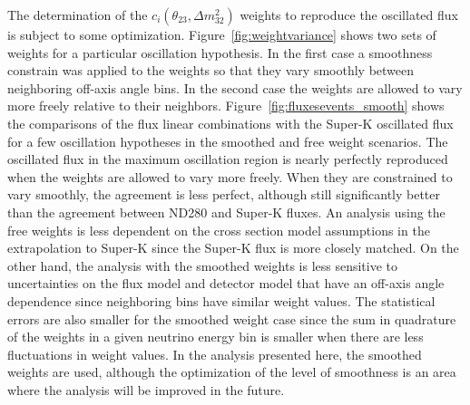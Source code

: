 The determination of the $c_i\left(\theta_{23},\Delta m^2_{32}\right)$ weights to reproduce the oscillated flux is subject to some optimization. Figure~\ref{fig:weightvariance} shows two sets of weights for a particular oscillation hypothesis.  In the first case a smoothness constrain was applied to the weights so that they vary smoothly between neighboring off-axis angle bins. In the second case the weights are allowed to vary more freely relative to their neighbors.  Figure~\ref{fig:fluxesevents_smooth} shows the comparisons of the \nuprismlite flux linear combinations with the Super-K oscillated flux for a few oscillation hypotheses in the smoothed and free weight scenarios.  The oscillated flux in the maximum oscillation region is nearly perfectly reproduced when the weights are allowed to vary more freely.  When they are constrained to vary smoothly, the agreement is less perfect, although still significantly better than the agreement between ND280 and Super-K fluxes.  An analysis using the free weights is less dependent on the cross section model assumptions in the extrapolation to Super-K since the Super-K flux is more closely matched.  On the other hand, the analysis with the smoothed weights is less sensitive to uncertainties on the flux model and \nuprismlite detector model that have an off-axis angle dependence since neighboring bins have similar weight values.  The statistical errors are also smaller for the smoothed weight case since the sum in quadrature of the weights in a given neutrino energy bin is smaller when there are less fluctuations in weight values.  In the analysis presented here, the smoothed weights are used, although the optimization of the level of smoothness is an area where the analysis will be improved in the future.


